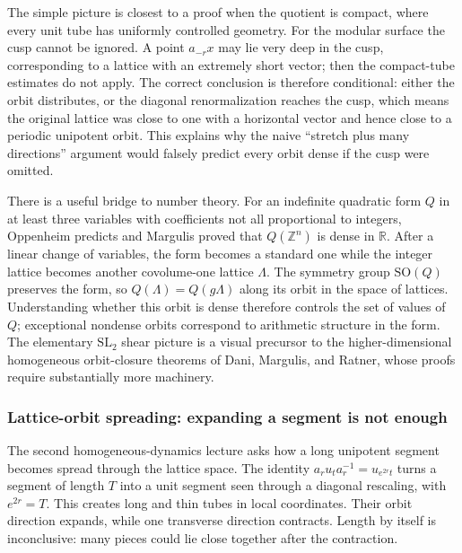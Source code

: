 The simple picture is closest to a proof when the quotient is compact, where every unit tube has uniformly controlled geometry. For the modular surface the cusp cannot be ignored. A point \(a_{-r}x\) may lie very deep in the cusp, corresponding to a lattice with an extremely short vector; then the compact-tube estimates do not apply. The correct conclusion is therefore conditional: either the orbit distributes, or the diagonal renormalization reaches the cusp, which means the original lattice was close to one with a horizontal vector and hence close to a periodic unipotent orbit. This explains why the naive ``stretch plus many directions'' argument would falsely predict every orbit dense if the cusp were omitted.

There is a useful bridge to number theory. For an indefinite quadratic form \(Q\) in at least three variables with coefficients not all proportional to integers, Oppenheim predicts and Margulis proved that \(Q(\mathbb Z^n)\) is dense in \(\mathbb R\). After a linear change of variables, the form becomes a standard one while the integer lattice becomes another covolume-one lattice \(\Lambda\). The symmetry group \(\mathrm{SO}(Q)\) preserves the form, so \(Q(\Lambda)=Q(g\Lambda)\) along its orbit in the space of lattices. Understanding whether this orbit is dense therefore controls the set of values of \(Q\); exceptional nondense orbits correspond to arithmetic structure in the form. The elementary \(\mathrm{SL}_2\) shear picture is a visual precursor to the higher-dimensional homogeneous orbit-closure theorems of Dani, Margulis, and Ratner, whose proofs require substantially more machinery.

\subsubsection{Lattice-orbit spreading: expanding a segment is not enough}\label{04-visual-computing-ii-ch033-lattice-orbit-spreading-expanding-a-segment-is-not-enough}

The second homogeneous-dynamics lecture asks how a long unipotent segment becomes spread through the lattice space. The identity \(a_r u_t a_r^{-1}=u_{e^{2r}t}\) turns a segment of length \(T\) into a unit segment seen through a diagonal rescaling, with \(e^{2r}=T\). This creates long and thin tubes in local coordinates. Their orbit direction expands, while one transverse direction contracts. Length by itself is inconclusive: many pieces could lie close together after the contraction.

